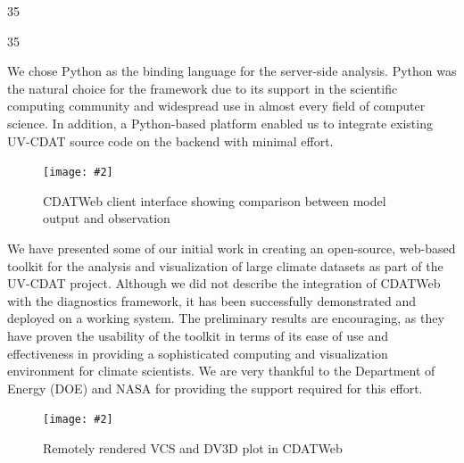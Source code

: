 \documentclass[a0,landscape]{a0poster}
\newenvironment{pcol}[1]{
  \begin{minipage}[t]{#1}
}{
  \end{minipage}
}
\newcommand{\myfig}[3][0]{
\begin{center}
  \vspace{0.7cm}
  \texttt{[image: \#2]}
  \nobreak
\end{center}}
\begin{document}
\begin{textblock}{35}
\begin{pcol}{\threecolwidth}
\begin{textblock}{35}
\begin{pcol}{35cm}
We chose Python as the binding language for the server-side analysis. Python was the natural choice for the framework due to its support in the scientific computing community and widespread use in almost every field of computer science. In addition, a Python-based platform enabled us to integrate existing UV-CDAT source code on the backend with minimal effort.

\begin{figure}[montage]
  \vspace{0.7cm}
  \myfig[0]{images/vcs_plots}{0.80}
  \caption{CDATWeb client interface showing comparison between model output and observation}
\end{figure}


We have presented some of our initial work in creating an open-source, web-based toolkit for the analysis and visualization of large climate datasets as part of the UV-CDAT project.  Although we did not describe the integration of CDATWeb with the diagnostics framework, it has been successfully demonstrated and deployed on a working system. The preliminary results are encouraging, as they have proven the usability of the toolkit in terms of its ease of use and effectiveness in providing a sophisticated computing and visualization environment for climate scientists.  We are very thankful to the Department of Energy (DOE) and NASA for providing the support required for this effort.

\begin{figure}[floodmap]
\myfig[1]{images/dv3d_plots}{0.80}
\caption{Remotely rendered VCS and DV3D plot in CDATWeb}
\end{figure}

\end{pcol}
\end{textblock}

\large
\end{pcol}
\end{textblock}
\end{document}
